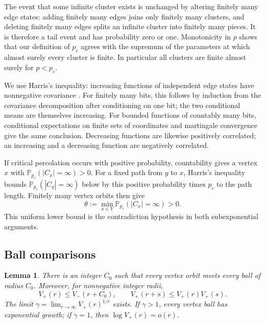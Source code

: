 \documentclass[11pt]{article}
\newtheorem{lemma}[theorem]{Lemma}
\theoremstyle{definition}
\begin{document}
The event that some infinite cluster exists is unchanged by altering
finitely many edge states: adding finitely many edges joins only
finitely many clusters, and deleting finitely many edges splits an
infinite cluster into finitely many pieces. It is therefore a tail
event and has probability zero or one. Monotonicity in $p$ shows that
our definition of $p_c$ agrees with the supremum of the parameters
at which almost surely every cluster is finite. In particular all
clusters are finite almost surely for $p<p_c$.

We use Harris's inequality: increasing functions of independent
edge states have nonnegative covariance \cite{Harris1960}.
For finitely many bits, this follows by induction from the covariance
decomposition after conditioning on one bit; the two conditional
means are themselves increasing. For bounded functions of countably
many bits, conditional expectations on finite sets of coordinates
and martingale convergence give the same conclusion. Decreasing
functions are likewise positively correlated; an increasing and a
decreasing function are negatively correlated.

If critical percolation occurs with positive probability, countability
gives a vertex $x$ with $\mathbb P_{p_c}(|C_x|=\infty)>0$.
For a fixed path from $y$ to $x$, Harris's inequality bounds
$\mathbb P_{p_c}(|C_y|=\infty)$ below by this positive probability times
$p_c$ to the path length. Finitely many vertex orbits then give
\begin{equation}
\label{eq:uniform-jump}
 \theta:=\min_{x\in V}\mathbb P_{p_c}(|C_x|=\infty)>0.
\end{equation}
This uniform lower bound is the contradiction hypothesis in both
subexponential arguments.

\subsection{Ball comparisons}

\begin{lemma}
\label{lem:orbit-growth}
There is an integer $C_0$ such that every vertex orbit meets every
ball of radius $C_0$. Moreover, for nonnegative integer radii,
\begin{equation}
\label{eq:ball-comparisons}
 V_+(r)\le V_-(r+C_0),\qquad
 V_+(r+s)\le V_+(r)V_+(s).
\end{equation}
The limit $\gamma=\lim_{r\to\infty}V_+(r)^{1/r}$ exists. If
$\gamma>1$, every vertex ball has exponential growth; if $\gamma=1$,
then $\log V_+(r)=o(r)$.
\end{lemma}
\end{document}
